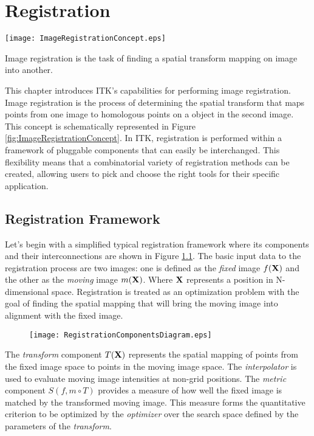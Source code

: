 \chapter{Registration}

\begin{floatingfigure}[rlp]{8cm}
  \centering
  \texttt{[image: ImageRegistrationConcept.eps]}
  \caption[Image Registration Concept]{Image registration is the task of
finding a spatial transform mapping on image into
another.\label{fig:ImageRegistrationConcept}}
\end{floatingfigure}

This chapter introduces ITK's capabilities for performing image
registration. Image registration is the process of determining the spatial
transform that maps points from one image to homologous points on a object in
the second image. This concept is schematically represented in Figure
\ref{fig:ImageRegistrationConcept}. In ITK, registration is performed within
a framework of pluggable components that can easily be interchanged.  This
flexibility means that a combinatorial variety of registration methods can be
created, allowing users to pick and choose the right tools for their specific
application.


\section{Registration Framework}
Let's begin with a simplified typical registration framework where its components
and their interconnections are shown in Figure \ref{fig:RegistrationComponents}.
The basic input data to the registration process are two images: one is defined
as the \emph{fixed} image $f(\bf{X})$ and the other as the \emph{moving} image
$m(\bf{X})$. Where $\bf{X}$ represents a position in N-dimensional space.
Registration is treated as an optimization problem with the goal of finding the
spatial mapping that will bring the moving image into alignment with the fixed image.

\begin{figure}
\center
\texttt{[image: RegistrationComponentsDiagram.eps]}
\label{fig:RegistrationComponents}
\end{figure}

The \emph{transform} component $T(\bf{X})$ represents the spatial mapping of
points from the fixed image space to points in the moving image space. The
\emph{interpolator} is used to evaluate moving image intensities at non-grid
positions. The \emph{metric} component $S(f,m \circ T)$ provides a measure of
how well the fixed image is matched by the transformed moving image. This
measure forms the quantitative criterion to be optimized by the
\emph{optimizer} over the search space defined by the parameters of the
\emph{transform}.

